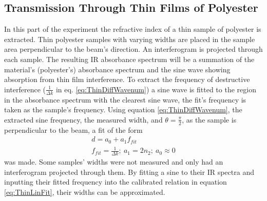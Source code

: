 \documentclass[reprint,amsmath,amssymb,aps, prl,superscriptaddress]{revtex4-2}
\begin{document}
\subsection{Transmission Through Thin Films of Polyester}
In this part of the experiment the refractive index of a thin sample of polyester is extracted. Thin polyester samples with varying widths are placed in the sample area perpendicular to the beam's direction. An interferogram is projected through each sample. The resulting IR absorbance spectrum will be a summation of the material's (polyester's) absorbance spectrum and the sine wave showing absorption from thin film interference. To extract the frequency of destructive interference ($\frac{1}{\Delta k}$ in eq. \ref{eq:ThinDiffWavenum}) a sine wave is fitted to the region in the absorbance spectrum with the clearest sine wave, the fit's frequency is taken as the sample's frequency. Using equation \ref{eq:ThinDiffWavenum}, the extracted sine frequency, the measured width, and $\theta=\frac{\pi}{2}$, as the sample is perpendicular to the beam, a fit of the form
\begin{equation}
    \begin{gathered}
        \label{eq:ThinLinFit}
        d=a_{0}+a_{1}f_{fit} \\
        f_{fit} = \frac{1}{\Delta k};\ a_1=2n_{2};\ a_0\approx 0
    \end{gathered}
\end{equation}
was made. Some samples' widths were not measured and only had an interferogram projected through them. By fitting a sine to their IR spectra and inputting their fitted frequency into the calibrated relation in equation \ref{eq:ThinLinFit}, their widths can be approximated.
\end{document}

